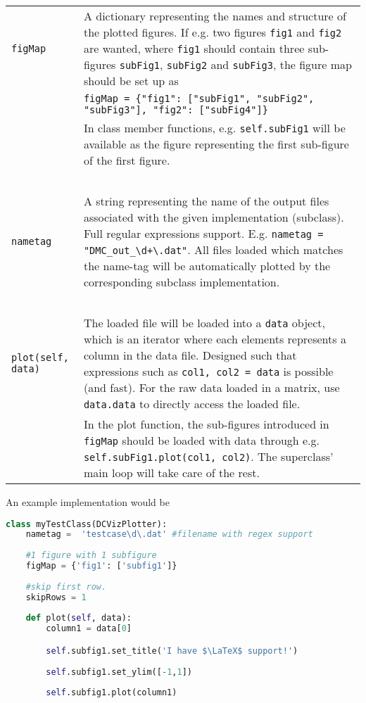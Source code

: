 \begin{small}
\begin{tabular}{lp{14cm}}
\verb+figMap+		& A dictionary representing the names and structure of the plotted figures. If e.g. two figures 				\verb+fig1+ and \verb+fig2+ are wanted, where \verb+fig1+ should contain three sub-figures 					\verb+subFig1+, \verb+subFig2+ and \verb+subFig3+, the figure map should be set up as \\					& \verb+figMap = {"fig1": ["subFig1", "subFig2", "subFig3"], "fig2": ["subFig4"]}+ \\
			& In class member functions, e.g. \verb+self.subFig1+ will be available as the figure representing the first sub-figure of the first figure. \\
			\ \\
\verb+nametag+		& A string representing the name of the output files associated with the given implementation 				(subclass). Full regular expressions support. E.g. \verb|nametag = "DMC_out_\d+\.dat"|. All files
			loaded which matches the name-tag will be automatically plotted by the corresponding subclass implementation. \\
			\ \\
\verb+plot(self, data)+& The loaded file will be loaded into a \verb+data+ object, which is an iterator where each elements
			represents a column in the data file. Designed such that expressions such as \verb+col1, col2 = data+ is possible (and fast). For the raw data loaded in a matrix, use \verb+data.data+ to directly access the loaded file.
			\ \\
			&In the plot function, the sub-figures introduced in \verb+figMap+ should be loaded with data through e.g. \verb+self.subFig1.plot(col1, col2)+. The superclass' main loop will take care of the rest.
\end{tabular}
\end{small}

An example implementation would be

\vspace{0.5cm}
\begin{lstlisting}[language=Python]
class myTestClass(DCVizPlotter):
    nametag =  'testcase\d\.dat' #filename with regex support
    
    #1 figure with 1 subfigure
    figMap = {'fig1': ['subfig1']}
    
    #skip first row.
    skipRows = 1    
    
    def plot(self, data):
        column1 = data[0]

        self.subfig1.set_title('I have $\LaTeX$ support!')
              
        self.subfig1.set_ylim([-1,1])
          
        self.subfig1.plot(column1)
\end{lstlisting}



